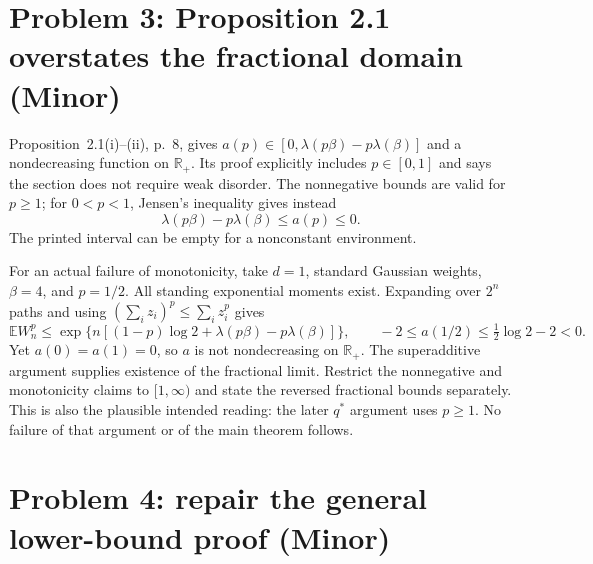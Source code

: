 \documentclass[10pt]{article}
\begin{document}
\section*{Problem 3: Proposition 2.1 overstates the fractional domain (Minor)}
Proposition 2.1(i)–(ii), p. 8, gives \(a(p)\in[0,\lambda(p\beta)-p\lambda(\beta)]\) and a nondecreasing function on \(\mathbb R_+\). Its proof explicitly includes \(p\in[0,1]\) and says the section does not require weak disorder. The nonnegative bounds are valid for \(p\geq1\); for \(0<p<1\), Jensen’s inequality gives instead \[\lambda(p\beta)-p\lambda(\beta)\leq a(p)\leq0.\] The printed interval can be empty for a nonconstant environment.\par
For an actual failure of monotonicity, take \(d=1\), standard Gaussian weights, \(\beta=4\), and \(p=1/2\). All standing exponential moments exist. Expanding over \(2^n\) paths and using \((\sum_i z_i)^p\leq\sum_i z_i^p\) gives \[\mathbb E W_n^p
 \leq \exp\{n[(1-p)\log2+\lambda(p\beta)-p\lambda(\beta)]\},
 \qquad
 -2\leq a(1/2)\leq\tfrac12\log2-2<0.\] Yet \(a(0)=a(1)=0\), so \(a\) is not nondecreasing on \(\mathbb R_+\). The superadditive argument supplies existence of the fractional limit. Restrict the nonnegative and monotonicity claims to \([1,\infty)\) and state the reversed fractional bounds separately. This is also the plausible intended reading: the later \(q^*\) argument uses \(p\geq1\). No failure of that argument or of the main theorem follows.\par
\section*{Problem 4: repair the general lower-bound proof (Minor)}
\end{document}
